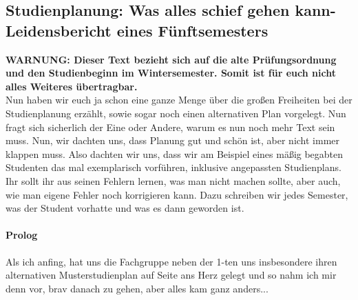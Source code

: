 \subsection{Studienplanung: Was alles schief gehen kann-
  Leidensbericht eines Fünftsemesters}
\label{studienplan_bericht}
  \textbf{WARNUNG: Dieser Text bezieht sich auf die alte
  Prüfungsordnung und den Studienbeginn im Wintersemester. Somit ist
  für euch nicht alles Weiteres übertragbar.}\\
Nun haben wir euch ja schon eine ganze Menge über die großen
Freiheiten bei der Studienplanung erzählt, sowie sogar noch einen
alternativen Plan vorgelegt. Nun fragt sich sicherlich der Eine oder
Andere, warum es nun noch mehr Text sein muss. Nun, wir dachten uns,
dass Planung gut und schön ist, aber nicht immer klappen muss. Also
dachten wir uns, dass wir am Beispiel eines mäßig begabten Studenten
das mal exemplarisch vorführen, inklusive angepassten
Studienplans. 
Ihr sollt ihr aus seinen Fehlern lernen, was man nicht machen sollte, aber
auch, wie man eigene Fehler noch korrigieren kann. Dazu schreiben wir
jedes Semester, was der Student vorhatte und was es dann geworden ist.
\paragraph{Prolog}
Als ich anfing, hat uns die Fachgruppe neben der 1-ten uns
insbesondere ihren alternativen Musterstudienplan auf Seite 
\pageref{studienplan_neu}
ans Herz gelegt und
so nahm ich mir denn vor, brav danach zu gehen, aber alles kam ganz
anders...
